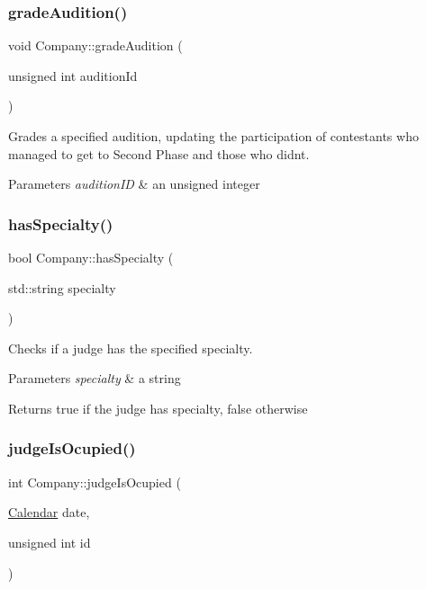 \subsubsection{\texorpdfstring{grade\+Audition()}{gradeAudition()}}
{\footnotesize\ttfamily void Company\+::grade\+Audition (\begin{DoxyParamCaption}\item[{unsigned int}]{audition\+Id }\end{DoxyParamCaption})}



Grades a specified audition, updating the participation of contestants who managed to get to Second Phase and those who didn\textquotesingle{}t. 


\begin{DoxyParams}{Parameters}
{\em audition\+ID} & an unsigned integer \\
\hline
\end{DoxyParams}
\mbox{\label{class_company_a3976d4ec91c9f9dfe1b777b4d7587684}} 
\subsubsection{\texorpdfstring{has\+Specialty()}{hasSpecialty()}}
{\footnotesize\ttfamily bool Company\+::has\+Specialty (\begin{DoxyParamCaption}\item[{std\+::string}]{specialty }\end{DoxyParamCaption})}



Checks if a judge has the specified specialty. 


\begin{DoxyParams}{Parameters}
{\em specialty} & a string \\
\hline
\end{DoxyParams}
\begin{DoxyReturn}{Returns}
true if the judge has specialty, false otherwise 
\end{DoxyReturn}
\mbox{\label{class_company_a65a8b53db0f81846a91709108f4e36fa}} 
\subsubsection{\texorpdfstring{judge\+Is\+Ocupied()}{judgeIsOcupied()}}
{\footnotesize\ttfamily int Company\+::judge\+Is\+Ocupied (\begin{DoxyParamCaption}\item[{\hyperlink{class_calendar}{Calendar}}]{date,  }\item[{unsigned int}]{id }\end{DoxyParamCaption})}



